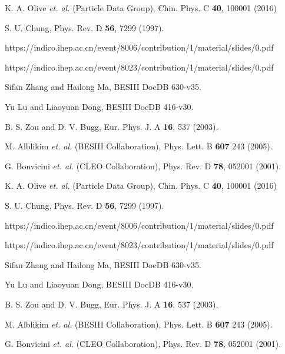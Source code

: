 \begin{thebibliography}{99}
K. A. Olive {\it et. al.} (Particle Data Group), 
Chin. Phys. C \textbf{40}, 100001 (2016)

S. U. Chung,
Phys. Rev. D \textbf{56}, 7299 (1997).

https://indico.ihep.ac.cn/event/8006/contribution/1/material/slides/0.pdf

https://indico.ihep.ac.cn/event/8023/contribution/1/material/slides/0.pdf


Sifan Zhang and Hailong Ma, 
BESIII DocDB 630-v35.

Yu Lu and Liaoyuan Dong, 
BESIII DocDB 416-v30.

B. S. Zou and D. V. Bugg, 
Eur. Phys. J. A \textbf{16}, 537 (2003).

M. Alblikim {\it et. al.}  (BESIII Collaboration),
Phys. Lett. B \textbf{607} 243 (2005).

G. Bonvicini {\it et. al.}  (CLEO Collaboration),
Phys. Rev. D \textbf{78}, 052001 (2001).


K. A. Olive {\it et. al.} (Particle Data Group), 
Chin. Phys. C \textbf{40}, 100001 (2016)

S. U. Chung,
Phys. Rev. D \textbf{56}, 7299 (1997).

https://indico.ihep.ac.cn/event/8006/contribution/1/material/slides/0.pdf

https://indico.ihep.ac.cn/event/8023/contribution/1/material/slides/0.pdf


Sifan Zhang and Hailong Ma, 
BESIII DocDB 630-v35.

Yu Lu and Liaoyuan Dong, 
BESIII DocDB 416-v30.

B. S. Zou and D. V. Bugg, 
Eur. Phys. J. A \textbf{16}, 537 (2003).

M. Alblikim {\it et. al.}  (BESIII Collaboration),
Phys. Lett. B \textbf{607} 243 (2005).

G. Bonvicini {\it et. al.}  (CLEO Collaboration),
Phys. Rev. D \textbf{78}, 052001 (2001).


\end{thebibliography}
